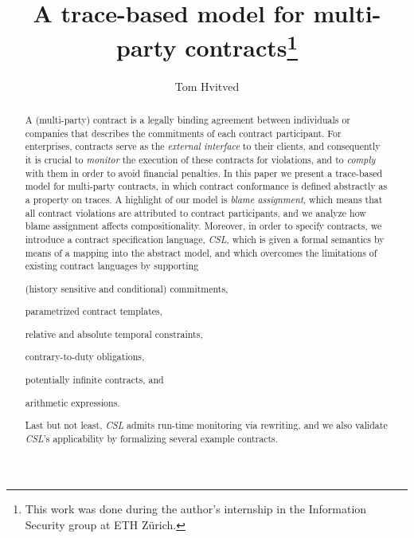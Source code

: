 \documentclass[orivec,final]{llncs-href}
\newcommand{\csl}{\textit{CSL}}
\begin{document}
\title{A trace-based model for multi-party contracts\thanks{This work
    was done during the author's internship in the Information
    Security group at ETH Z\"urich.}}
\author{Tom Hvitved}

\maketitle

\begin{abstract}
  A (multi-party) contract is a legally binding agreement between
  individuals or companies that describes the commitments
  of each contract participant. For enterprises, contracts
  serve as the \emph{external interface} to their clients, and
  consequently it is crucial to \emph{monitor} the execution of these
  contracts for violations, and to \emph{comply} with them in order to
  avoid financial penalties. In this paper we present a trace-based
  model for multi-party contracts, in which contract conformance is
  defined abstractly as a property on traces. A highlight of our model
  is \emph{blame assignment}, which means that all
  contract violations are attributed to contract participants, and we
  analyze how blame assignment affects compositionality. Moreover, in
  order to specify contracts, we introduce a contract specification
  language, \csl{}, which is given a formal semantics by means of a
  mapping into the abstract model, and which overcomes the limitations
  of existing contract languages by supporting
  \begin{inparaenum}[(a)]
  \item (history sensitive and conditional) commitments,
  \item parametrized contract templates,
  \item relative and absolute temporal constraints,
  \item contrary-to-duty obligations,
  \item potentially infinite contracts, and
  \item arithmetic expressions.
  \end{inparaenum}
  Last but not least, \csl{} admits run-time monitoring via rewriting,
  and we also validate \csl{}'s applicability by formalizing several
  example contracts.
\end{abstract}
\end{document}

